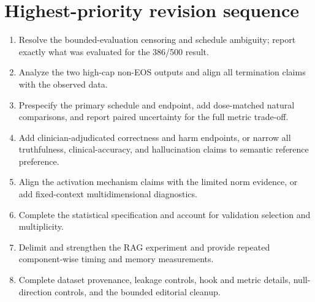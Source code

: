 \documentclass[11pt]{article}
\begin{document}
\section*{Highest-priority revision sequence}

\begin{enumerate}
    \item Resolve the bounded-evaluation censoring and schedule ambiguity; report exactly what was evaluated for the 386/500 result.
    \item Analyze the two high-cap non-EOS outputs and align all termination claims with the observed data.
    \item Prespecify the primary schedule and endpoint, add dose-matched natural comparisons, and report paired uncertainty for the full metric trade-off.
    \item Add clinician-adjudicated correctness and harm endpoints, or narrow all truthfulness, clinical-accuracy, and hallucination claims to semantic reference preference.
    \item Align the activation mechanism claims with the limited norm evidence, or add fixed-context multidimensional diagnostics.
    \item Complete the statistical specification and account for validation selection and multiplicity.
    \item Delimit and strengthen the RAG experiment and provide repeated component-wise timing and memory measurements.
    \item Complete dataset provenance, leakage controls, hook and metric details, null-direction controls, and the bounded editorial cleanup.
\end{enumerate}
\end{document}
